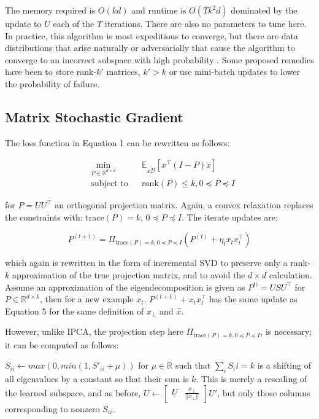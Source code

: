 \documentclass[11pt,letterpaper]{article}
\begin{document}
The memory required is $O(kd)$ and runtime is $O(Tk^2d)$ dominated by the update to $U$ each of the $T$ iterations. There are also no parameters to tune here. In practice, this algorithm is most expeditious to converge, but there are data distributions that arise naturally or adversarially that cause the algorithm to converge to an incorrect subspace with high probability \cite{arora1}. Some proposed remedies have been to store rank-$k'$ matrices, $k' > k$ or use mini-batch updates to lower the probability of failure. 


\subsection{Matrix Stochastic Gradient}

The loss function in Equation 1 can be rewritten as follows:

\begin{equation}
\begin{aligned}
& \underset{P \in \mathbb{R}^{d \times d}}{\text{min}}
& & \mathbb{E}_{\mathcal{x \tilde D}}\left[ x^{\top}(I - P)x\right] \\
& \text{subject to}
& & \text{rank}(P)\leq k, 0 \preceq P \preceq I
\end{aligned}
\end{equation}

for $P = UU^{\top}$ an orthogonal projection matrix. Again, a convex relaxation replaces the constraints with: trace$(P) = k$, $0 \preceq P \preceq I$. The iterate updates are:

\begin{equation}
P^{(t + 1)} = \Pi_{\text{trace}(P) = k, 0 \preceq P \preceq I} \left(P^{(t)} + \eta_tx_tx_t^{\top}\right)
\end{equation}

which again is rewritten in the form of incremental SVD to preserve only a rank-$k$ approximation of the true projection matrix, and to avoid the $d \times d$ calculation. Assume an approximation of the eigendecomposition is given as $P^{t)} = USU^{\top}$ for $P \in \mathbb{R}^{d \times k}$, then for a new example $x_t$, $P^{(t+1)} + x_tx_t^{\top}$ has the same update as Equation 5 for the same definition of $x_{\perp}$ and $\hat{x}$. 

However, unlike IPCA, the projection step here $ \Pi_{\text{trace}(P) = k, 0 \preceq P \preceq I}$, is necessary; it can be computed as follows:

$S_{ii} \gets max(0, min(1, S'_{ii} + \mu))$ for $\mu \in \mathbb{R}$ such that $\sum_i S_ii = k$ is a shifting of all eigenvalues by a constant so that their sum is $k$. This is merely a rescaling of the learned subspace, and as before, $U \gets \begin{bmatrix} U & \frac{x_{\perp}}{||x_{\perp}||} \end{bmatrix} U'$, but only those columns corresponding to nonzero $S_{ii}$.
\end{document}
